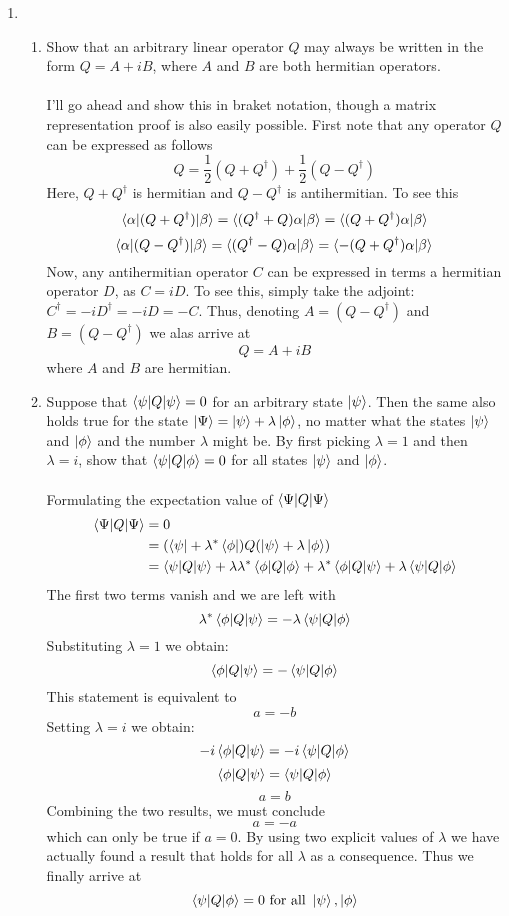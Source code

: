 \documentclass[11pt,letterpaper]{article}
\begin{document}
\begin{enumerate}
\item \begin{enumerate} \item Show that an arbitrary linear operator $Q$ may always be written in the form $Q=A+iB$, where $A$ and $B$ are both hermitian operators.
\\ \\I'll go ahead and show this in braket notation, though a matrix representation proof is also easily possible. First note that any operator $Q$ can be expressed as follows
$$Q = \frac{1}{2}(Q+Q^\dag)+\frac{1}{2}(Q-Q^\dag)$$
Here, $Q+Q^\dag$ is hermitian and $Q-Q^\dag$ is antihermitian. To see this
$$\braket{\alpha|(Q+Q^\dag)|\beta}=\braket{(Q^\dag+Q)\alpha|\beta} = \braket{(Q+Q^\dag)\alpha|\beta}$$
$$\braket{\alpha|(Q-Q^\dag)|\beta}=\braket{(Q^\dag-Q)\alpha|\beta} = \braket{-(Q+Q^\dag)\alpha|\beta}$$
Now, any antihermitian operator $C$ can be expressed in terms a hermitian operator $D$, as $C=iD$. To see this, simply take the adjoint: $C^\dag = -iD^\dag = -iD=-C$. Thus, denoting $A = (Q-Q^\dag)$ and $B=(Q-Q^\dag)$ we alas arrive at
$$Q = A+iB$$
where $A$ and $B$ are hermitian.
\item Suppose that $\braket{\psi |Q| \psi} = 0$ for an arbitrary state $\ket\psi$. Then the same also holds true for the state $\ket \Psi = \ket \psi + \lambda\ket\phi$, no matter what the states $\ket\psi$ and $\ket\phi$ and the number $\lambda$ might be. By first picking $\lambda =1$ and then $\lambda=i$, show that $\braket{\psi |Q| \phi} =0$ for all states $\ket\psi$ and $\ket\phi$.
\\ \\Formulating the expectation value of $\braket{\Psi|Q|\Psi}$ 
\begin{align*}\braket{\Psi|Q|\Psi} &=0\\&= (\bra\psi + \lambda^*\bra\phi)Q(\ket\psi +\lambda\ket\phi)\\
&=\braket{\psi|Q|\psi}+\lambda\lambda^*\braket{\phi|Q|\phi}+\lambda^*\braket{\phi|Q|\psi}+\lambda\braket{\psi|Q|\phi}\end{align*}
The first two terms vanish and we are left with
$$\lambda^*\braket{\phi|Q|\psi}=-\lambda\braket{\psi|Q|\phi}$$
Substituting $\lambda = 1$ we obtain:
$$\braket{\phi|Q|\psi} = -\braket{\psi|Q|\phi}$$
This statement is equivalent to
$$a = -b$$
Setting $\lambda = i$ we obtain:
$$-i\braket{\phi|Q|\psi} = -i\braket{\psi|Q|\phi}$$
$$\braket{\phi|Q|\psi} = \braket{\psi|Q|\phi}$$
$$a = b$$
Combining the two results, we must conclude
$$a = -a$$
which can only be true if $a=0$. By using two explicit values of $\lambda$ we have actually found a result that holds for all $\lambda$ as a consequence. Thus we finally arrive at
$$\braket{\psi|Q|\phi}=0\ \text{for all}\ \ket \psi\text , \ket\phi$$


\end{enumerate}
\end{enumerate}
\end{document}

